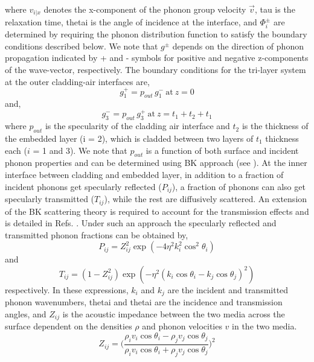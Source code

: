 where $v_{i|x}$ denotes the x-component of the phonon group velocity $\vec{v}$, \gls{tau} is the relaxation time, \gls{thetai} is the angle of incidence at the interface, and $\Phi_i^\pm$ are determined by requiring the phonon distribution function to satisfy the boundary conditions described below. We note that $g^\pm$ depends on the direction of phonon propagation indicated by + and - symbols for positive and negative z-components of the wave-vector, respectively. The boundary conditions for the tri-layer system at the outer cladding-air interfaces are,
\begin{equation}
  g_1^+= p_{out}\, g_1^- \: \textrm{at}  \: z=0  
\end{equation}
and, 
\begin{equation}
  g_3^-= p_{out}\, g_3^+ \: \textrm{at} \: z=t_1+t_2+t_1
\end{equation}
where $p_{out}$ is the specularity of the cladding air interface and $t_2$ is the thickness of the embedded layer (i = 2), which is cladded between two layers of $t_1$ thickness each ($i$ = 1 and 3). We note that $p_{out}$ is a function of both surface and incident phonon properties and can be determined using BK approach (see ). At the inner interface between cladding and embedded layer, in addition to a fraction of incident phonons get specularly reflected ($P_{ij}$), a fraction of phonons can also get specularly transmitted ($T_{ij}$), while the rest are diffusively scattered. An extension of the BK scattering theory is required to account for the transmission effects and is detailed in Refs. \cite{RN396,RN340}. Under such an approach the specularly reflected and transmitted phonon fractions can be obtained by, 
\begin{equation}
P_{ij} = Z_{ij}^{2} \exp{(-4\eta^{2} k_{i}^{2} \cos^{2} \theta_{i})}
\label{eq:bezak_reflection}
\end{equation} 
and
\begin{equation}
T_{ij} = (1-Z_{ij}^{2}) \exp{(-\eta^{2} (k_{i} \cos\theta_{i}-k_{j}\cos\theta_{j})^{2})}
\label{eq:bezak_transmission}
\end{equation} 
respectively. In these expressions, $k_i$ and $k_j$ are the incident and transmitted phonon wavenumbers, \gls{thetai} and \gls{thetai} are the incidence and transmission angles, and $Z_{ij}$ is the acoustic impedance between the two media across the surface dependent on the densities $\rho$ and phonon velocities $v$ in the two media.
\begin{equation}
Z_{ij} = \Bigg( \frac{ \rho_{i}v_{i}\cos\theta_{i}-\rho_{j}v_{j}\cos\theta_{j} }{ \rho_{i}v_{i}\cos\theta_{i}+\rho_{j}v_{j}\cos\theta_{j} } \Bigg)^{2}
\label{eq:bezak_acc_mismatch}
\end{equation} 
